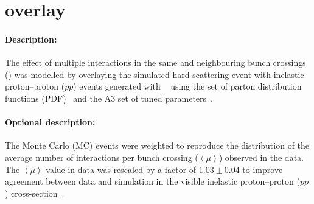 \section{\Pileup overlay}

\paragraph{Description:}

The effect of multiple interactions in the same and neighbouring bunch
crossings (\pileup) was modelled by overlaying the simulated hard-scattering event with 
inelastic proton--proton ($pp$) events generated with \PYTHIA[8.186]~\cite{Sjostrand:2007gs} 
using the \NNPDF[2.3lo] set of parton distribution functions (PDF)~\cite{Ball:2012cx} and the 
A3 set of tuned parameters~\cite{ATL-PHYS-PUB-2016-017}.

\paragraph{Optional description:}

The Monte Carlo (MC) events were weighted to reproduce the
distribution of the average number of interactions per bunch crossing
($\left<\mu \right>$) observed in the data. The $\left<\mu \right>$
value in data was rescaled by a factor of $1.03\pm 0.04$ to improve
agreement between data and simulation in the visible inelastic
proton--proton ($pp$) cross-section~\cite{STDM-2015-05}.

